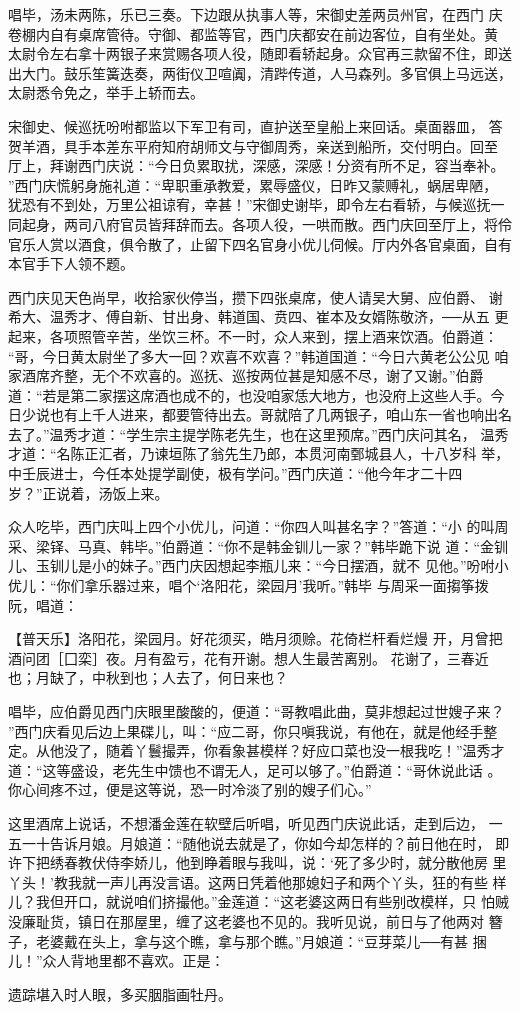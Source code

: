唱毕，汤未两陈，乐已三奏。下边跟从执事人等，宋御史差两员州官，在西门
庆卷棚内自有桌席管待。守御、都监等官，西门庆都安在前边客位，自有坐处。黄
太尉令左右拿十两银子来赏赐各项人役，随即看轿起身。众官再三款留不住，即送
出大门。鼓乐笙簧迭奏，两街仪卫喧阗，清跸传道，人马森列。多官俱上马远送，
太尉悉令免之，举手上轿而去。

宋御史、候巡抚吩咐都监以下军卫有司，直护送至皇船上来回话。桌面器皿，
答贺羊酒，具手本差东平府知府胡师文与守御周秀，亲送到船所，交付明白。回至
厅上，拜谢西门庆说：“今日负累取扰，深感，深感！分资有所不足，容当奉补。
”西门庆慌躬身施礼道：“卑职重承教爱，累辱盛仪，日昨又蒙赙礼，蜗居卑陋，
犹恐有不到处，万里公祖谅宥，幸甚！”宋御史谢毕，即令左右看轿，与候巡抚一
同起身，两司八府官员皆拜辞而去。各项人役，一哄而散。西门庆回至厅上，将伶
官乐人赏以酒食，俱令散了，止留下四名官身小优儿伺候。厅内外各官桌面，自有
本官手下人领不题。

西门庆见天色尚早，收拾家伙停当，攒下四张桌席，使人请吴大舅、应伯爵、
谢希大、温秀才、傅自新、甘出身、韩道国、贲四、崔本及女婿陈敬济，──从五
更起来，各项照管辛苦，坐饮三杯。不一时，众人来到，摆上酒来饮酒。伯爵道：
“哥，今日黄太尉坐了多大一回？欢喜不欢喜？”韩道国道：“今日六黄老公公见
咱家酒席齐整，无个不欢喜的。巡抚、巡按两位甚是知感不尽，谢了又谢。”伯爵
道：“若是第二家摆这席酒也成不的，也没咱家恁大地方，也没府上这些人手。今
日少说也有上千人进来，都要管待出去。哥就陪了几两银子，咱山东一省也响出名
去了。”温秀才道：“学生宗主提学陈老先生，也在这里预席。”西门庆问其名，
温秀才道：“名陈正汇者，乃谏垣陈了翁先生乃郎，本贯河南鄄城县人，十八岁科
举，中壬辰进士，今任本处提学副使，极有学问。”西门庆道：“他今年才二十四
岁？”正说着，汤饭上来。

众人吃毕，西门庆叫上四个小优儿，问道：“你四人叫甚名字？”答道：“小
的叫周采、梁铎、马真、韩毕。”伯爵道：“你不是韩金钏儿一家？”韩毕跪下说
道：“金钏儿、玉钏儿是小的妹子。”西门庆因想起李瓶儿来：“今日摆酒，就不
见他。”吩咐小优儿：“你们拿乐器过来，唱个‘洛阳花，梁园月’我听。”韩毕
与周采一面搊筝拨阮，唱道：

【普天乐】洛阳花，梁园月。好花须买，皓月须赊。花倚栏杆看烂熳
开，月曾把酒问团［囗栾］夜。月有盈亏，花有开谢。想人生最苦离别。
花谢了，三春近也；月缺了，中秋到也；人去了，何日来也？

唱毕，应伯爵见西门庆眼里酸酸的，便道：“哥教唱此曲，莫非想起过世嫂子来？
”西门庆看见后边上果碟儿，叫：“应二哥，你只嗔我说，有他在，就是他经手整
定。从他没了，随着丫鬟撮弄，你看象甚模样？好应口菜也没一根我吃！”温秀才
道：“这等盛设，老先生中馈也不谓无人，足可以够了。”伯爵道：“哥休说此话
。你心间疼不过，便是这等说，恐一时冷淡了别的嫂子们心。”

这里酒席上说话，不想潘金莲在软壁后听唱，听见西门庆说此话，走到后边，
一五一十告诉月娘。月娘道：“随他说去就是了，你如今却怎样的？前日他在时，
即许下把绣春教伏侍李娇儿，他到睁着眼与我叫，说：‘死了多少时，就分散他房
里丫头！’教我就一声儿再没言语。这两日凭着他那媳妇子和两个丫头，狂的有些
样儿？我但开口，就说咱们挤撮他。”金莲道：“这老婆这两日有些别改模样，只
怕贼没廉耻货，镇日在那屋里，缠了这老婆也不见的。我听见说，前日与了他两对
簪子，老婆戴在头上，拿与这个瞧，拿与那个瞧。”月娘道：“豆芽菜儿──有甚
捆儿！”众人背地里都不喜欢。正是：

遗踪堪入时人眼，多买胭脂画牡丹。